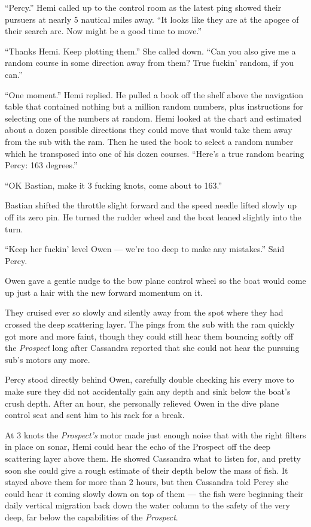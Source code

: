 \documentclass[
]{scrbook}
\begin{document}
``Percy.'' Hemi called up to the control room as the latest ping showed
their pursuers at nearly 5 nautical miles away. ``It looks like they are
at the apogee of their search arc. Now might be a good time to move.''

``Thanks Hemi. Keep plotting them.'' She called down. ``Can you also
give me a random course in some direction away from them? True fuckin'
random, if you can.''

``One moment.'' Hemi replied. He pulled a book off the shelf above the
navigation table that contained nothing but a million random numbers,
plus instructions for selecting one of the numbers at random. Hemi
looked at the chart and estimated about a dozen possible directions they
could move that would take them away from the sub with the ram. Then he
used the book to select a random number which he transposed into one of
his dozen courses. ``Here's a true random bearing Percy: 163 degrees.''

``OK Bastian, make it 3 fucking knots, come about to 163.''

Bastian shifted the throttle slight forward and the speed needle lifted
slowly up off its zero pin. He turned the rudder wheel and the boat
leaned slightly into the turn.

``Keep her fuckin' level Owen --- we're too deep to make any mistakes.''
Said Percy.

Owen gave a gentle nudge to the bow plane control wheel so the boat
would come up just a hair with the new forward momentum on it.

They cruised ever so slowly and silently away from the spot where they
had crossed the deep scattering layer. The pings from the sub with the
ram quickly got more and more faint, though they could still hear them
bouncing softly off the \emph{Prospect} long after Cassandra reported
that she could not hear the pursuing sub's motors any more.

Percy stood directly behind Owen, carefully double checking his every
move to make sure they did not accidentally gain any depth and sink
below the boat's crush depth. After an hour, she personally relieved
Owen in the dive plane control seat and sent him to his rack for a
break.

At 3 knots the \emph{Prospect's} motor made just enough noise that with
the right filters in place on sonar, Hemi could hear the echo of the
Prospect off the deep scattering layer above them. He showed Cassandra
what to listen for, and pretty soon she could give a rough estimate of
their depth below the mass of fish. It stayed above them for more than 2
hours, but then Cassandra told Percy she could hear it coming slowly
down on top of them --- the fish were beginning their daily vertical
migration back down the water column to the safety of the very deep, far
below the capabilities of the \emph{Prospect}.
\end{document}
